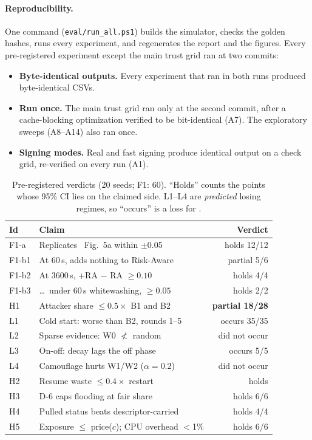 \paragraph{Reproducibility.}
One command (\texttt{eval/run\_all.ps1}) builds the simulator, checks the
golden hashes, runs every experiment, and regenerates the report and the
figures. Every pre-registered experiment except the main trust grid ran
at two commits:
\begin{itemize}
\item \textbf{Byte-identical outputs.} Every experiment that ran in both
  runs produced byte-identical CSVs.
\item \textbf{Run once.} The main trust grid ran only at the second
  commit, after a cache-blocking optimization verified to be bit-identical
  (A7). The exploratory sweeps (A8--A14) also ran once.
\item \textbf{Signing modes.} Real and fast signing produce identical
  output on a check grid, re-verified on every run (A1).
\end{itemize}

\begin{table}[t]
\caption{Pre-registered verdicts (20 seeds; F1: 60). ``Holds'' counts the
points whose 95\% CI lies on the claimed side. L1--L4 are
\emph{predicted} losing regimes, so ``occurs'' is a loss for \sys{}.}
\label{tab:verdicts}
\small
\begin{tabular}{@{}llr@{}}
\toprule
Id & Claim & Verdict \\
\midrule
F1-a & Replicates~\cite{wang2026agenticp2p} Fig.~5a within $\pm$0.05 & holds 12/12 \\
F1-b1 & At 60\,s, \sys{} adds nothing to Risk-Aware & partial 5/6 \\
F1-b2 & At 3600\,s, \sys{}+RA $-$ RA $\ge 0.10$ & holds 4/4 \\
F1-b3 & \ldots\ under 60\,s whitewashing, $\ge 0.05$ & holds 2/2 \\
H1 & Attacker share $\le 0.5\times$ B1 and B2 & \textbf{partial 18/28} \\
L1 & Cold start: worse than B2, rounds 1--5 & occurs 35/35 \\
L2 & Sparse evidence: W0 $\not<$ random & did not occur \\
L3 & On-off: decay lags the off phase & occurs 5/5 \\
L4 & Camouflage hurts W1/W2 ($\alpha{=}0.2$) & did not occur \\
H2 & Resume waste $\le 0.4\times$ restart & holds \\
H3 & D-6 caps flooding at fair share & holds 6/6 \\
H4 & Pulled status beats descriptor-carried & holds 4/4 \\
H5 & Exposure $\le$ price($c$); CPU overhead $<$1\% & holds 6/6 \\
\bottomrule
\end{tabular}
\end{table}

